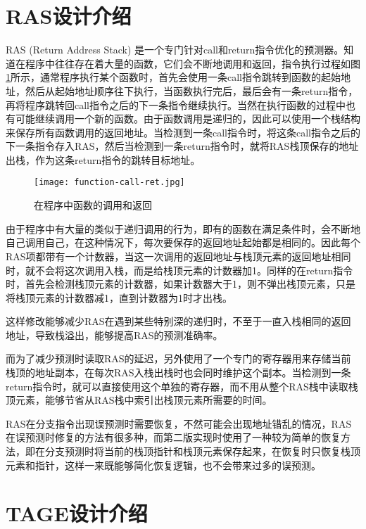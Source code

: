 \section{RAS设计介绍}

RAS (Return Address Stack) 是一个专门针对call和return指令优化的预测器。知道在程序中往往存在着大量的函数，它们会不断地调用和返回，指令执行过程如图\ref{fig:figure22}所示，通常程序执行某个函数时，首先会使用一条call指令跳转到函数的起始地址，然后从起始地址顺序往下执行，当函数执行完后，最后会有一条return指令，再将程序跳转回call指令之后的下一条指令继续执行。当然在执行函数的过程中也有可能继续调用一个新的函数。由于函数调用是递归的，因此可以使用一个栈结构来保存所有函数调用的返回地址。当检测到一条call指令时，将这条call指令之后的下一条指令存入RAS，然后当检测到一条return指令时，就将RAS栈顶保存的地址出栈，作为这条return指令的跳转目标地址。

\begin{figure}[htb]
	\centering
	\setlength\tabcolsep{3pt}  %
	\vspace{5pt} %
	\texttt{[image: function-call-ret.jpg]}
	\caption{在程序中函数的调用和返回}
	\label{fig:figure22}
\end{figure}

由于程序中有大量的类似于递归调用的行为，即有的函数在满足条件时，会不断地自己调用自己，在这种情况下，每次要保存的返回地址起始都是相同的。因此每个RAS项都带有一个计数器，当这一次调用的返回地址与栈顶元素的返回地址相同时，就不会将这次调用入栈，而是给栈顶元素的计数器加1。同样的在return指令时，首先会检测栈顶元素的计数器，如果计数器大于1，则不弹出栈顶元素，只是将栈顶元素的计数器减1，直到计数器为1时才出栈。

这样修改能够减少RAS在遇到某些特别深的递归时，不至于一直入栈相同的返回地址，导致栈溢出，能够提高RAS的预测准确率。

而为了减少预测时读取RAS的延迟，另外使用了一个专门的寄存器用来存储当前栈顶的地址副本，在每次RAS入栈出栈时也会同时维护这个副本。当检测到一条return指令时，就可以直接使用这个单独的寄存器，而不用从整个RAS栈中读取栈顶元素，能够节省从RAS栈中索引出栈顶元素所需要的时间。

RAS在分支指令出现误预测时需要恢复，不然可能会出现地址错乱的情况，RAS在误预测时修复的方法有很多种\cite{ras-recovey, ras-revisited}，而第二版实现时使用了一种较为简单的恢复方法，即在分支预测时将当前的栈顶指针和栈顶元素保存起来，在恢复时只恢复栈顶元素和指针，这样一来既能够简化恢复逻辑，也不会带来过多的误预测。

\section{TAGE设计介绍}

